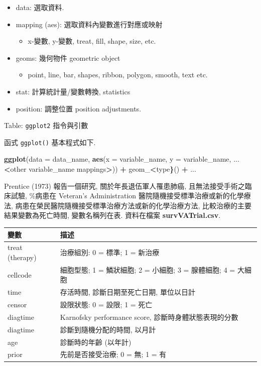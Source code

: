 \documentclass[
]{book}
\newenvironment{Shaded}{\begin{snugshade}}{\end{snugshade}}
\newcommand{\DataTypeTok}[1]{\textcolor[rgb]{0.13,0.29,0.53}{#1}}
\newcommand{\ErrorTok}[1]{\textcolor[rgb]{0.64,0.00,0.00}{\textbf{#1}}}
\newcommand{\KeywordTok}[1]{\textcolor[rgb]{0.13,0.29,0.53}{\textbf{#1}}}
\newcommand{\NormalTok}[1]{#1}
\newcommand{\OperatorTok}[1]{\textcolor[rgb]{0.81,0.36,0.00}{\textbf{#1}}}
\newcommand{\StringTok}[1]{\textcolor[rgb]{0.31,0.60,0.02}{#1}}
\providecommand{\tightlist}{%
  \setlength{\itemsep}{0pt}\setlength{\parskip}{0pt}}
\begin{document}
\begin{itemize}
\tightlist
\item
  data: 選取資料.
\item
  mapping (aes): 選取資料內變數進行對應或映射

  \begin{itemize}
  \tightlist
  \item
    x-變數, y-變數, treat, fill, shape, size, etc.
  \end{itemize}
\item
  geoms: 幾何物件 geometric object

  \begin{itemize}
  \tightlist
  \item
    point, line, bar, shapes, ribbon, polygon, smooth, text etc.
  \end{itemize}
\item
  stat: 計算統計量/變數轉換, statistics
\item
  position: 調整位置 position adjustments.
\end{itemize}

Table: \texttt{ggplot2} 指令與引數

函式 \texttt{ggplot()} 基本程式如下.

\begin{Shaded}
\begin{Highlighting}[]
\KeywordTok{ggplot}\NormalTok{(}\DataTypeTok{data =}\NormalTok{ data\_name, }
       \KeywordTok{aes}\NormalTok{(}\DataTypeTok{x =}\NormalTok{ variable\_name,}
           \DataTypeTok{y =}\NormalTok{ variable\_name,}
\NormalTok{           ... }\OperatorTok{\textless{}}\NormalTok{other variable\_name mappings}\OperatorTok{\textgreater{}}\NormalTok{)) }\OperatorTok{+}
\StringTok{  }\NormalTok{geom\_}\OperatorTok{\textless{}}\NormalTok{type}\ErrorTok{\}}\NormalTok{() }\OperatorTok{+}\StringTok{ }
\StringTok{  }\NormalTok{...}
\end{Highlighting}
\end{Shaded}

Prentice (1973) 報告一個研究,
關於年長退伍軍人罹患肺癌, 且無法接受手術之臨床試驗,
\%病患在 Veteran's Administration 醫院隨機接受標準治療或新的化學療法,
病患在榮民醫院隨機接受標準治療方法或新的化學治療方法,
比較治療的主要結果變數為死亡時間,
變數名稱列在表.
資料在檔案 \textbf{survVATrial.csv}.

\begin{longtable}[]{@{}ll@{}}
\toprule
變數 & 描述\tabularnewline
\midrule
\endhead
treat (therapy) & 治療組別: 0 = 標準; 1 = 新治療\tabularnewline
cellcode & 細胞型態; 1 = 鱗狀細胞; 2 = 小細胞; 3 = 腺體細胞; 4 = 大細胞\tabularnewline
time & 存活時間, 診斷日期至死亡日期, 單位以日計\tabularnewline
censor & 設限狀態: 0 = 設限; 1 = 死亡\tabularnewline
diagtime & Karnofsky performance score, 診斷時身體狀態表現的分數\tabularnewline
diagtime & 診斷到隨機分配的時間, 以月計\tabularnewline
age & 診斷時的年齡 (以年計)\tabularnewline
prior & 先前是否接受治療; 0 = 無; 1 = 有\tabularnewline
\bottomrule
\end{longtable}
\end{document}

